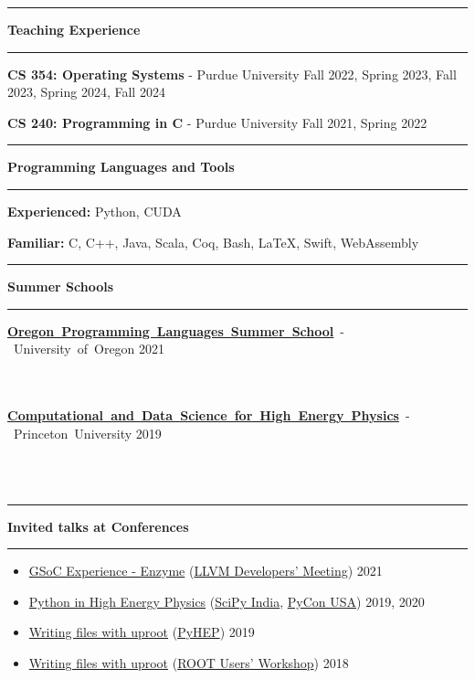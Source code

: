 \documentclass[10pt, letterpaper]{article}
\newcommand{\EducationEntry}[4]{
    \noindent\mbox{#1} \hfill
    \mbox{#2} \\
    \indent
    \mbox{\textit{#3}} \vspace{5pt}\\
    \parbox[t][\height][c]{\textwidth}{\small{#4}}
	\vspace{-14pt}
}
\newcommand{\Section}[1]{
    \Line \par
    \vspace{1pt}
    \textbf{\fontsize{13}{13}\selectfont #1} \par
    \vspace{-7pt}
    \Line \par
    \vspace{3pt}
}
\newcommand{\Line}{
\noindent\rule{\textwidth}{0.4pt}}
\newenvironment{tightitemize}
{
    \vspace{-\topsep}
    \begin{itemize}
        \itemsep2pt \parskip0pt \parsep0pt
}
{
    \end{itemize}
    \vspace{-\topsep}
}
\begin{document}
\Section{Teaching Experience}
\vspace{-4pt}
\textbf{CS 354: Operating Systems} - Purdue University \hfill{Fall 2022, Spring 2023, Fall 2023, Spring 2024, Fall 2024}

\textbf{CS 240: Programming in C} - Purdue University \hfill{Fall 2021, Spring 2022}
\vspace{-6pt}

%
%
\Section{Programming Languages and Tools}
\vspace{-4pt}
\textbf{Experienced:} Python, CUDA

\textbf{Familiar:} C, C++, Java, Scala, Coq, Bash, \LaTeX, Swift, WebAssembly
\vspace{-6pt}

%
%
\Section{Summer Schools}
\vspace{-4pt}
\indent \EducationEntry{\textbf{{\href{https://www.cs.uoregon.edu/research/summerschool/summer21/index.php}{Oregon Programming Languages Summer School}}} - University of Oregon}{2021}{}{}\vspace{-15pt}\\
\indent \EducationEntry{\textbf{{\href{https://codas-hep.org/}{Computational and Data Science for High Energy Physics}}} - Princeton University}{2019}{}{}\\

\vspace{-34pt}

%
%
\Section{Invited talks at Conferences}
\small{\begin{tightitemize}
\item \href{https://youtu.be/mxI9fYbpndI}{GSoC Experience - Enzyme} (\href{https://llvm.swoogo.com/2021devmtg/}{LLVM Developers' Meeting}) \hfill{2021}
\item \href{https://youtu.be/jClVsR6XfdI}{Python in High Energy Physics} (\href{https://scipy.in/2019}{SciPy India}, \href{https://us.pycon.org/2020/}{PyCon USA}) \hfill{2019, 2020}
\item \href{https://indico.cern.ch/event/833895/contributions/3577892/attachments/1927752/3191883/uproot-pyhep.pdf}{Writing files with uproot} (\href{https://indico.cern.ch/event/833895/}{PyHEP}) \hfill{2019}
\item \href{https://indico.cern.ch/event/697389/contributions/3102807/attachments/1713054/2762448/Writing_files_with_uproot.pdf}{Writing files with uproot} (\href{https://indico.cern.ch/event/697389/}{ROOT Users' Workshop}) \hfill{2018}
\end{tightitemize}}
\end{document}
